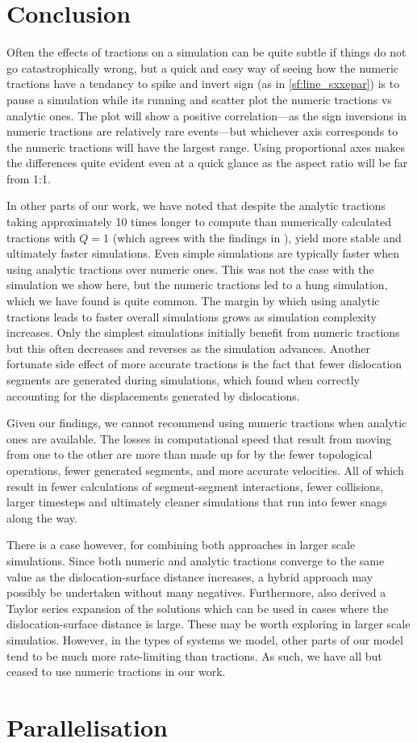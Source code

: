 \section{Conclusion}\label{s:paperConclusion}

Often the effects of tractions on a simulation can be quite subtle if things do not go catastrophically wrong, but a quick and easy way of seeing how the numeric tractions have a tendancy to spike and invert sign (as in \cref{sf:line_sxxepar}) is to pause a simulation while its running and scatter plot the numeric tractions vs analytic ones. The plot will show a positive correlation---as the sign inversions in numeric tractions are relatively rare events---but whichever axis corresponds to the numeric tractions will have the largest range. Using proportional axes makes the differences quite evident even at a quick glance as the aspect ratio will be far from 1:1.

In other parts of our work, we have noted that despite the analytic tractions taking approximately 10 times longer to compute than numerically calculated tractions with $Q = 1$ (which agrees with the findings in \cite{analytic_tractions}), yield more stable and ultimately faster simulations. Even simple simulations are typically faster when using analytic tractions over numeric ones. This was not the case with the simulation we show here, but the numeric tractions led to a hung simulation, which we have found is quite common. The margin by which using analytic tractions leads to faster overall simulations grows as simulation complexity increases. Only the simplest simulations initially benefit from numeric tractions but this often decreases and reverses as the simulation advances. Another fortunate side effect of more accurate tractions is the fact that fewer dislocation segments are generated during simulations, which \citet{bromage2018calculating} found when correctly accounting for the displacements generated by dislocations.

Given our findings, we cannot recommend using numeric tractions when analytic ones are available. The losses in computational speed that result from moving from one to the other are more than made up for by the fewer topological operations, fewer generated segments, and more accurate velocities. All of which result in fewer calculations of segment-segment interactions, fewer collisions, larger timesteps and ultimately cleaner simulations that run into fewer snags along the way.

There is a case however, for combining both approaches in larger scale simulations. Since both numeric and analytic tractions converge to the same value as the dislocation-surface distance increases, a hybrid approach may possibly be undertaken without many negatives. Furthermore, \cite{analytic_tractions} also derived a Taylor series expansion of the solutions which can be used in cases where the dislocation-surface distance is large. These may be worth exploring in larger scale simulatios. However, in the types of systems we model, other parts of our model tend to be much more rate-limiting than tractions. As such, we have all but ceased to use numeric tractions in our work.

\section{Parallelisation}\label{s:parallel}